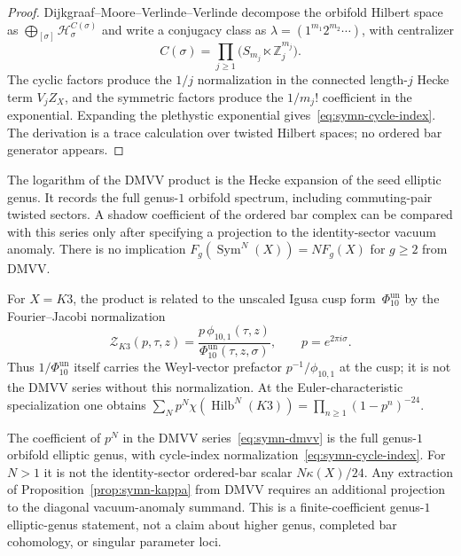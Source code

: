 \begin{proof}
Dijkgraaf--Moore--Verlinde--Verlinde \cite{DMVV97} decompose the
orbifold Hilbert space as
$\bigoplus_{[\sigma]}\mathcal H_\sigma^{C(\sigma)}$ and write a
conjugacy class as
$\lambda=(1^{m_1}2^{m_2}\cdots)$, with centralizer
\[
 C(\sigma)
 =
 \prod_{j\geq1}\bigl(S_{m_j}\ltimes \mathbb Z_j^{m_j}\bigr).
\]
The cyclic factors produce the $1/j$ normalization in the connected
length-$j$ Hecke term $V_jZ_X$, and the symmetric factors produce
the $1/m_j!$ coefficient in the exponential. Expanding the
plethystic exponential gives~\eqref{eq:symn-cycle-index}. The
derivation is a trace calculation over twisted Hilbert spaces; no
ordered bar generator appears.
\end{proof}

\begin{remark}
\label{rem:symn-dmvv-shadow}
The logarithm of the DMVV product is the Hecke expansion of the
seed elliptic genus. It records the full genus-$1$ orbifold
spectrum, including commuting-pair twisted sectors. A shadow
coefficient of the ordered bar complex can be compared with this
series only after specifying a projection to the identity-sector
vacuum anomaly. There is no implication
$F_g(\operatorname{Sym}^N(X))=N F_g(X)$ for $g\geq2$ from DMVV.
\end{remark}

For $X = K3$, the product is related to the unscaled Igusa cusp
form~$\Phi_{10}^{\mathrm{un}}$ by the Fourier--Jacobi normalization
\[
 \mathcal Z_{K3}(p,\tau,z)
 =
 \frac{p\,\phi_{10,1}(\tau,z)}
      {\Phi_{10}^{\mathrm{un}}(\tau,z,\sigma)},
 \qquad p=e^{2\pi i\sigma}.
\]
Thus $1/\Phi_{10}^{\mathrm{un}}$ itself carries the Weyl-vector
prefactor $p^{-1}/\phi_{10,1}$ at the cusp; it is not the DMVV
series without this normalization. At the Euler-characteristic
specialization one obtains
$\sum_N p^N \chi(\operatorname{Hilb}^N(K3))
= \prod_{n \geq 1}(1 - p^n)^{-24}$.

\begin{proposition}\label{prop:symn-dmvv-kappa}
The coefficient of $p^N$ in the DMVV series~\eqref{eq:symn-dmvv}
is the full genus-$1$ orbifold elliptic genus, with cycle-index
normalization~\eqref{eq:symn-cycle-index}. For $N>1$ it is not the
identity-sector ordered-bar scalar $N\kappa(X)/24$. Any extraction
of Proposition~\ref{prop:symn-kappa} from DMVV requires an
additional projection to the diagonal vacuum-anomaly summand. This
is a finite-coefficient genus-$1$ elliptic-genus statement, not a
claim about higher genus, completed bar cohomology, or singular
parameter loci.
\end{proposition}

